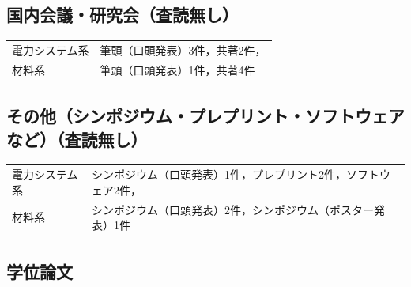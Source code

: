 
\subsection*{国内会議・研究会（査読無し）}

\begin{tabular}[t]{@{}l@{：}l@{}}
電力システム系 & 筆頭（口頭発表）3件，共著2件，\\
材料系 & 筆頭（口頭発表）1件，共著4件
\end{tabular}

\begin{refsection}
\nocite{*}
\printbibliography[heading=none]
\end{refsection}


\subsection*{その他（シンポジウム・プレプリント・ソフトウェアなど）（査読無し）}

\begin{tabular}[t]{@{}l@{：}l@{}}
電力システム系 & シンポジウム（口頭発表）1件，プレプリント2件，ソフトウェア2件，\\
材料系 & シンポジウム（口頭発表）2件，シンポジウム（ポスター発表）1件
\end{tabular}

\begin{refsection}
\nocite{*}
\printbibliography[heading=none]
\end{refsection}


\subsection*{学位論文}

